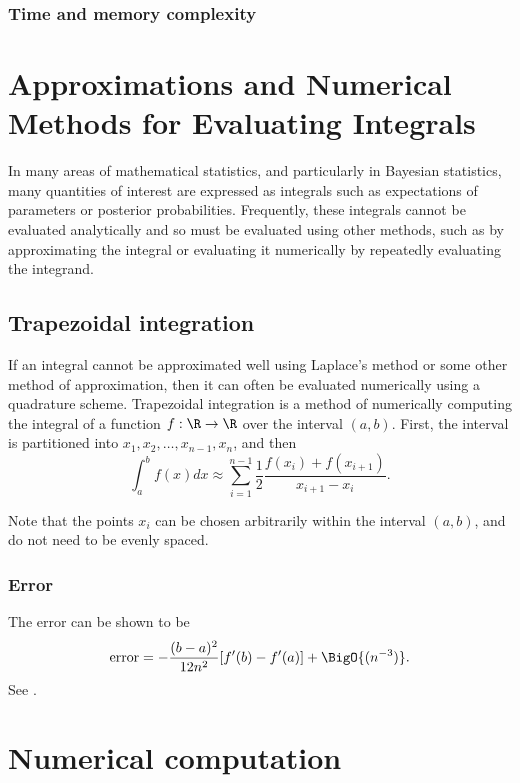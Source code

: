 \subsubsection{Time and memory complexity}

\section{Approximations and Numerical Methods for Evaluating Integrals}
In many areas of mathematical statistics, and particularly in Bayesian statistics, many quantities of interest
are expressed as integrals such as expectations of parameters or posterior probabilities. Frequently, these
integrals cannot be evaluated analytically and so must be evaluated using other methods, such as by
approximating the integral or evaluating it numerically by repeatedly evaluating the integrand.

\subsection{Trapezoidal integration}

If an integral cannot be approximated well using Laplace's method or some other method of approximation, then
it can often be evaluated numerically using a quadrature scheme. Trapezoidal integration is a method of
numerically computing the integral of a function $f: \R \to \R$ over the interval $(a, b)$. First, the
interval is partitioned into $x_1, x_2, \ldots, x_{n-1}, x_n$, and then
\[
	\int_a^b f(x) dx \approx \sum_{i=1}^{n-1} \frac{1}{2} \frac{f(x_i) + f(x_{i+1})}{x_{i+1} - x_i}.
\]

Note that the points $x_i$ can be chosen arbitrarily within the interval $(a, b)$, and do not need to be
evenly spaced.

\subsubsection{Error}
The error can be shown to be
\[
	\text{error} = -\frac{(b - a)^2}{12 n^2}[f'(b) - f'(a)] + \BigO{(n^{-3})}.
\]
See \cite{Cruz-Uribe2002}.

\section{Numerical computation}


